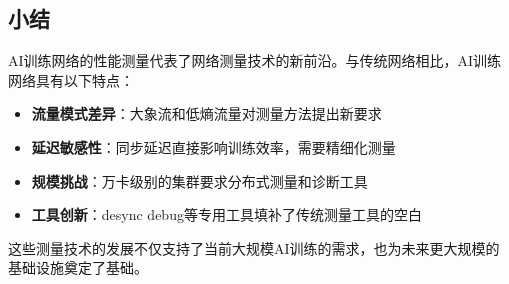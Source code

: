 \subsection{小结}

AI训练网络的性能测量代表了网络测量技术的新前沿。与传统网络相比，AI训练网络具有以下特点：

\begin{itemize}
    \item \textbf{流量模式差异}：大象流和低熵流量对测量方法提出新要求
    \item \textbf{延迟敏感性}：同步延迟直接影响训练效率，需要精细化测量
    \item \textbf{规模挑战}：万卡级别的集群要求分布式测量和诊断工具
    \item \textbf{工具创新}：desync debug等专用工具填补了传统测量工具的空白
\end{itemize}

这些测量技术的发展不仅支持了当前大规模AI训练的需求，也为未来更大规模的基础设施奠定了基础。